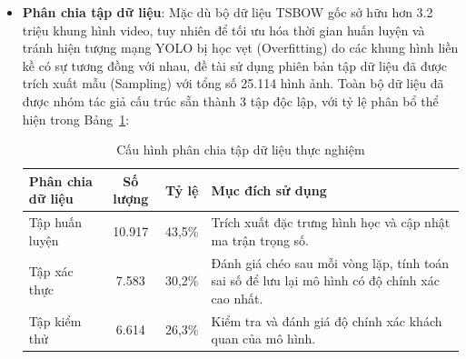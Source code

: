 \begin{itemize}
	\item \textbf{Phân chia tập dữ liệu}: Mặc dù bộ dữ liệu TSBOW gốc sở hữu hơn 3.2 triệu khung hình video, tuy nhiên để tối ưu hóa thời gian huấn luyện và tránh hiện tượng mạng YOLO bị học vẹt (Overfitting) do các khung hình liền kề có sự tương đồng với nhau, đề tài sử dụng phiên bản tập dữ liệu đã được trích xuất mẫu (Sampling) với tổng số 25.114 hình ảnh. Toàn bộ dữ liệu đã được nhóm tác giả cấu trúc sẵn thành 3 tập độc lập, với tỷ lệ phân bổ thể hiện trong Bảng~\ref{dataset_split}:
	
	
	\begin{table}[htbp]
		\centering
		\caption{Cấu hình phân chia tập dữ liệu thực nghiệm}
		\label{dataset_split}
		\begin{tabularx}{\textwidth}{@{} l c c X @{}}
			\toprule
			\textbf{Phân chia dữ liệu} & \textbf{Số lượng} & \textbf{Tỷ lệ} & \textbf{Mục đích sử dụng} \\ 
			\midrule
			Tập huấn luyện & 10.917 & 43,5\% & Trích xuất đặc trưng hình học và cập nhật ma trận trọng số. \\ \addlinespace
			Tập xác thực & 7.583 & 30,2\% & Đánh giá chéo sau mỗi vòng lặp, tính toán sai số để lưu lại mô hình có độ chính xác cao nhất. \\ \addlinespace
			Tập kiểm thử & 6.614 & 26,3\% & Kiểm tra và đánh giá độ chính xác khách quan của mô hình. \\ 
			\bottomrule
		\end{tabularx}
	\end{table}
	

\end{itemize}
